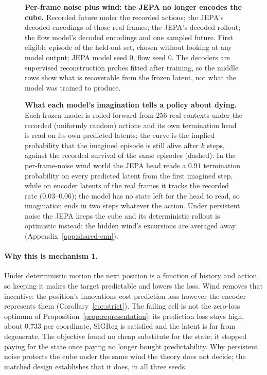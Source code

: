 \begin{figure}[t]
\centering
{}
\caption{\textbf{Per-frame noise plus wind: the JEPA no longer encodes the cube.} Recorded future
under the recorded actions; the JEPA's decoded encodings of those real frames; the JEPA's decoded
rollout; the flow model's decoded encodings and one sampled future. First eligible episode of the
held-out set, chosen without looking at any model output; JEPA model seed 0, flow seed 0. The
decoders are supervised reconstruction probes fitted after training, so the middle rows show what
is recoverable from the frozen latent, not what the model was trained to produce.}
\label{fig:wind-filmstrip}
\end{figure}

\begin{figure}[t]
\centering
{}
\caption{\textbf{What each model's imagination tells a policy about dying.} Each frozen model is
rolled forward from 256 real contexts under the recorded (uniformly random) actions and its own
termination head is read on its own predicted latents; the curve is the implied probability that the
imagined episode is still alive after $k$ steps, against the recorded survival of the same episodes
(dashed). In the per-frame-noise wind world the JEPA head reads a $0.91$ termination probability on
every predicted latent from the first imagined step, while on encoder latents of the real frames it
tracks the recorded rate ($0.03$--$0.06$); the model has no state left for the head to read, so
imagination ends in two steps whatever the action. Under persistent noise the JEPA keeps the cube
and its deterministic rollout is optimistic instead: the hidden wind's excursions are averaged away
(Appendix~\ref{app:shared-cnn}).}
\label{fig:imagined-termination}
\end{figure}

\paragraph{Why this is mechanism 1.}
Under deterministic motion the next position is a function of history and action, so keeping it
makes the target predictable and lowers the loss. Wind removes that incentive: the position's
innovations cost prediction loss however the encoder represents them (Corollary~\ref{cor:strict}).
The failing cell is not the zero-loss optimum of Proposition~\ref{prop:representation}: its
prediction loss stays high, about $0.733$ per coordinate, SIGReg is satisfied and the latent is far
from degenerate. The objective found no cheap substitute for the state; it stopped paying for the
state once paying no longer bought predictability. Why persistent noise protects the cube under the
same wind the theory does not decide; the matched design establishes that it does, in all three
seeds.


